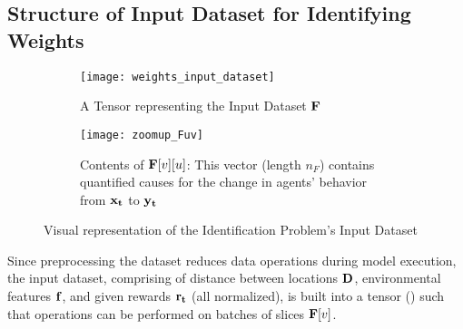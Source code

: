 \subsection{Structure of Input Dataset for Identifying Weights} \label{sec:Structure of Input Dataset for Identifying Weights}
\begin{figure}[!htbp]
    \begin{subfigure}{.64\textwidth}
        \centering
        \texttt{[image: weights\_input\_dataset]}
        \caption{A Tensor representing the Input Dataset $\mathbf{F}$}
        \label{fig:A Tensor representing the complete Input Dataset}
    \end{subfigure}
    \begin{subfigure}{.35\textwidth}
        \centering
        \texttt{[image: zoomup\_Fuv]}
        \caption{Contents of $\mathbf{F}[v][u]$: This vector (length $n_F$) contains quantified causes for the change in agents' behavior from $\mathbf{x_t}$ to $\mathbf{y_t}$}
        \label{fig:Zoomed-in contents of Fvu}
    \end{subfigure}
    \caption{Visual representation of the Identification Problem's Input Dataset}
    \label{fig:Visual representation of the Identification Problem's Input Dataset}
\end{figure}
Since preprocessing the dataset reduces data operations during model execution, the input dataset, comprising of distance between locations $\mathbf{D}$, environmental features $\mathbf{f}$, and given rewards $\mathbf{r_t}$ (all normalized), is built into a tensor () such that operations can be performed on batches of slices $\mathbf{F}[v]$.

